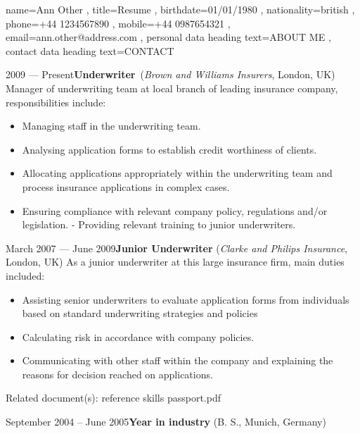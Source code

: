\documentclass[a4paper, 12pt]{classycv}
\begin{document}
\begin{Resume}{%
	name=Ann Other%
	, title=Resume%
	, birthdate={01/01/1980}%
	, nationality=british%
	, phone=+44 1234567890%
	, mobile=+44 0987654321%
	, email=ann.\-other\-@ad\-dress.\-com%
	, personal data heading text={\MakeUppercase{About Me}}
	, contact data heading text={\MakeUppercase{Contact}}
}
%
%
%
\begin{Entry}[skip above=2em]{2009 --- Present}{\textbf{Underwriter}~(\textit{Brown and Williams Insurers}, London, UK)}
Manager of underwriting team at local branch of leading insurance company, responsibilities include:
	\begin{itemize}
		\item Managing staff in the underwriting team.
		\item Analysing application forms to establish credit worthiness of clients.
		\item Allocating applications appropriately within the underwriting team and process insurance applications in complex cases.
		\item Ensuring compliance with relevant company policy, regulations and/or legislation. - Providing relevant training to junior underwriters.
	\end{itemize}
\end{Entry}
%
\begin{Entry}[skip above=2em]{March 2007 --- June 2009}{\textbf{Junior Underwriter} (\textit{Clarke and Philips Insurance}, London, UK)}
As a junior underwriter at this large insurance firm, main duties included:
\begin{itemize}
	\item Assisting senior underwriters to evaluate application forms from individuals based on standard underwriting strategies and policies
	\item Calculating risk in accordance with company policies.
	\item Communicating with other staff within the company and explaining the reasons for decision reached on applications.
\end{itemize}%
\hspace*{\fill}\textcolor{accent-background}{Related document(s):} reference skills passport.pdf
\end{Entry}
%
\begin{Entry}[skip above=2em]{September 2004 – June 2005}{\textbf{Year in industry} (B. S., Munich, Germany)}

\end{Entry}
\end{Resume}
\end{document}

